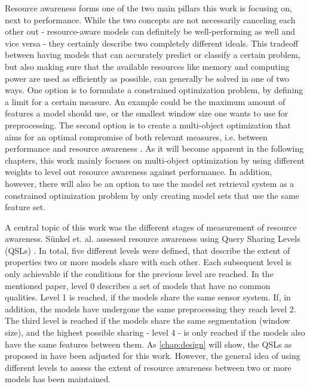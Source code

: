 Resource awareness forms one of the two main pillars this work is focusing on, next to performance. While the two concepts are not necessarily canceling each other out - resource-aware models can definitely be well-performing as well and vice versa - they certainly describe two completely different ideals. This tradeoff between having models that can accurately predict or classify a certain problem, but also making sure that the available resources like memory and computing power are used as efficiently as possible, can generally be solved in one of two ways. One option is to formulate a constrained optimization problem, by defining a limit for a certain measure. An example could be the maximum amount of features a model should use, or the smallest window size one wants to use for preprocessing. The second option is to create a multi-object optimization that aims for an optimal compromise of both relevant measures, i.e. between performance and resource awareness \cite{feurer2019}. As it will become apparent in the following chapters, this work mainly focuses on multi-object optimization by using different weights to level out resource awareness against performance. In addition, however, there will also be an option to use the model set retrieval system as a constrained optimization problem by only creating model sets that use the same feature set.

A central topic of this work was the different stages of measurement of resource awareness. Sünkel et. al. assessed resource awareness using Query Sharing Levels (QSLs) \cite{sunkel2022}. In total, five different levels were defined, that describe the extent of properties two or more models share with each other. Each subsequent level is only achievable if the conditions for the previous level are reached. In the mentioned paper, level 0 describes a set of models that have no common qualities. Level 1 is reached, if the models share the same sensor system. If, in addition, the models have undergone the same preprocessing they reach level 2. The third level is reached if the models share the same segmentation (window size), and the highest possible sharing - level 4 - is only reached if the models also have the same features between them. As \autoref{chap:design} will show, the QSLs as proposed in \cite{sunkel2022} have been adjusted for this work. However, the general idea of using different levels to assess the extent of resource awareness between two or more models has been maintained.

